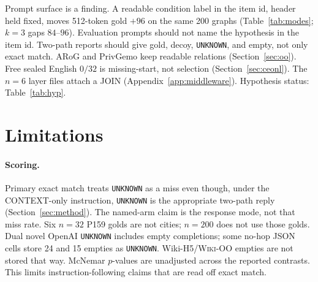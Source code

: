 \documentclass[10pt]{article} %
\begin{document}
Prompt surface is a finding.
A readable condition label in the item id, header held fixed, moves
512-token gold ${+}96$ on the same 200 graphs (Table~\ref{tab:modes};
$k{=}3$ gaps $84$--$96$).
Evaluation prompts should not name the hypothesis in the item id.
Two-path reports should give gold, decoy, \texttt{UNKNOWN}, and empty,
not only exact match.
ARoG and PrivGemo keep readable relations (Section~\ref{sec:oo}).
Free sealed English $0/32$ is missing-start, not selection
(Section~\ref{sec:ceonl}).
The $n{=}6$ layer files attach a JOIN
(Appendix~\ref{app:middleware}).
Hypothesis status: Table~\ref{tab:hyp}.

\section{Limitations}
\label{sec:limitations}

\paragraph{Scoring.}
Primary exact match treats \texttt{UNKNOWN} as a miss even though, under
the CONTEXT-only instruction, \texttt{UNKNOWN} is the appropriate
two-path reply (Section~\ref{sec:method}).
The named-arm claim is the response mode, not that miss rate.
Six $n{=}32$ P159 golds are not cities; $n{=}200$ does not use those golds.
Dual novel OpenAI \texttt{UNKNOWN} includes empty completions; some no-hop
JSON cells store 24 and 15 empties as \texttt{UNKNOWN}.
Wiki-H5/\textsc{Wiki-OO} empties are not stored that way.
McNemar $p$-values are unadjusted across the reported contrasts.
This limits instruction-following claims that are read off exact match.
\end{document}
